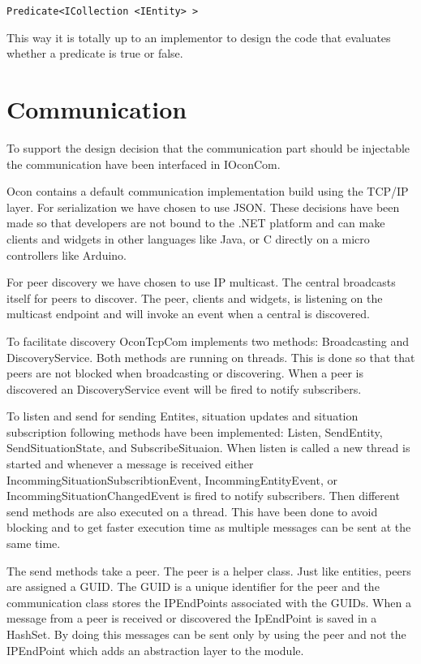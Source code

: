 \documentclass[../report.tex]{subfiles}
\begin{document}
\begin{center}
\texttt{Predicate<ICollection <IEntity> >}
\end{center}


This way it is totally up to an implementor to design the code that evaluates whether a predicate is true or false.

\section{Communication}

To support the design decision that the communication part should be injectable the communication have been interfaced in IOconCom.

Ocon contains a default communication implementation build using the TCP/IP layer. For serialization we have chosen to use JSON. These decisions have been made so that developers are not bound to the .NET platform and can make clients and widgets in other languages like Java, or C directly on a micro controllers like Arduino.

For peer discovery we have chosen to use IP multicast. The central broadcasts itself for peers to discover. The peer, clients and widgets, is listening on the multicast endpoint and will invoke an event when a central is discovered.

To facilitate discovery OconTcpCom implements two methods: Broadcasting and DiscoveryService. Both methods are running on threads. This is done so that that peers are not blocked when broadcasting or discovering. When a peer is discovered an DiscoveryService event will be fired to notify subscribers.

To listen and send for sending Entites, situation updates and situation subscription following methods have been implemented: Listen, SendEntity, SendSituationState, and SubscribeSituaion. When listen is called a new thread is started and whenever a message is received either IncommingSituationSubscribtionEvent, IncommingEntityEvent, or IncommingSituationChangedEvent is fired to notify subscribers. Then different send methods are also executed on a thread. This have been done to avoid blocking and to get faster execution time as multiple messages can be sent at the same time.

The send methods take a peer. The peer is a helper class. Just like entities, peers are assigned a GUID. The GUID is a unique identifier for the peer and the communication class stores the IPEndPoints associated with the GUIDs. When a message from a peer is received or discovered the IpEndPoint is saved in a HashSet. By doing this messages can be sent only by using the peer and not the IPEndPoint which adds an abstraction layer to the module. 
\end{document}
